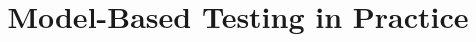 \documentclass{vldb}
\begin{document}

\title{Model-Based Testing in Practice}



%
%
%
%
\end{document}

